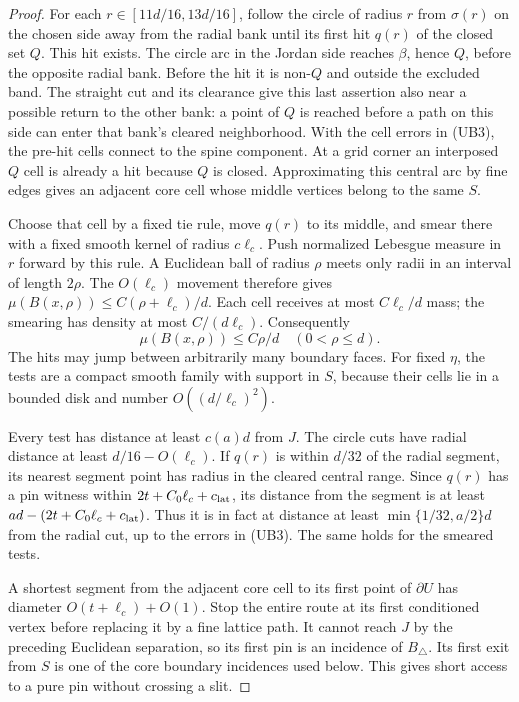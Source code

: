 \begin{proof}
For each \(r\in[11d/16,13d/16]\), follow the circle of radius \(r\)
from \(\sigma(r)\) on the chosen side away from the radial bank
until its first hit \(q(r)\) of the closed set \(Q\).  This hit
exists.  The circle arc in the Jordan side reaches \(\beta\), hence
\(Q\), before the opposite radial bank.  Before the hit it is
non-\(Q\) and outside the excluded band.  The straight cut and its
clearance give this last assertion also near a possible return to
the other bank: a point of \(Q\) is reached before a path on this
side can enter that bank's cleared neighborhood.  With the cell
errors in (UB3), the pre-hit cells connect to the spine component.
At a grid corner an interposed \(Q\) cell is already a hit because
\(Q\) is closed.  Approximating this central arc by fine edges gives
an adjacent core cell whose middle vertices belong to the same \(S\).

Choose that cell by a fixed tie rule, move \(q(r)\) to its middle,
and smear there with a fixed smooth kernel of radius \(c\ell_c\).
Push normalized Lebesgue measure in \(r\) forward by this rule.
A Euclidean ball of radius \(\rho\) meets only radii in an interval
of length \(2\rho\).  The \(O(\ell_c)\) movement therefore gives
\(\mu(B(x,\rho))\le C(\rho+\ell_c)/d\).  Each cell receives at most
\(C\ell_c/d\) mass; the smearing has density at most \(C/(d\ell_c)\).
Consequently
\[
                  \mu(B(x,\rho))\le C\rho/d
                  \quad(0<\rho\le d).                            \tag{UB4}
\]
The hits may jump between arbitrarily many boundary faces.  For fixed
\(\eta\), the tests are a compact smooth family with support in \(S\),
because their cells lie in a bounded disk and number \(O((d/\ell_c)^2)\).

Every test has distance at least \(c(a)d\) from \(J\).  The circle
cuts have radial distance at least \(d/16-O(\ell_c)\).  If \(q(r)\) is
within \(d/32\) of the radial segment, its nearest segment point has
radius in the cleared central range.  Since \(q(r)\) has a pin
witness within \(2t+C_0\ell_c+c_{\rm lat}\), its distance from the segment
is at least \(ad-(2t+C_0\ell_c+c_{\rm lat})\).  Thus it is in fact at
distance at least \(\min\{1/32,a/2\}d\) from the radial cut, up to
the errors in (UB3).  The same holds for the smeared tests.

A shortest segment from the adjacent core cell to its first point of
\(\partial U\) has diameter \(O(t+\ell_c)+O(1)\).  Stop the entire route
at its first conditioned vertex before replacing it by a fine lattice
path.  It cannot reach \(J\) by the preceding Euclidean separation,
so its first pin is an incidence of \(B_\triangle\).  Its first exit
from \(S\) is one of the core boundary incidences used below.  This
gives short access to a pure pin without crossing a slit.


\end{proof}
